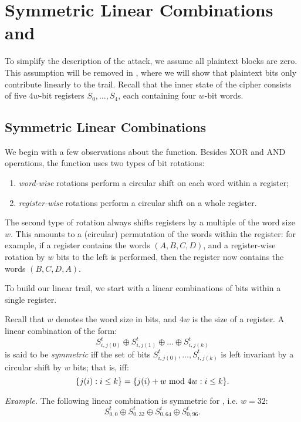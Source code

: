 
\section{Symmetric Linear Combinations and \MiniMORUS}
\label{sec/introminimorus}

To simplify the description of the attack, we assume all plaintext blocks are zero. This assumption will be removed in , where we will show that plaintext bits only contribute linearly to the trail. Recall that the inner state of the cipher consists of five $4w$-bit registers $S_0,\dots,S_4$, each containing four $w$-bit words.

\subsection{Symmetric Linear Combinations}

We begin with a few observations about the \StateUpdate{} function. Besides XOR and AND operations, the \StateUpdate{} function uses two types of bit rotations:
\begin{enumerate}
\item \emph{word-wise} rotations perform a circular shift on each word within a register;
\item \emph{register-wise} rotations perform a circular shift on a whole register.
\end{enumerate}
The second type of rotation always shifts registers by a multiple of the word size $w$. This amounts to a (circular) permutation of the words within the register: for example, if a register contains the words $(A, B, C, D)$, and a register-wise rotation by $w$ bits to the left is performed, then the register now contains the words $(B, C, D, A)$.

To build our linear trail, we start with a linear combinations of bits within a single register.
\begin{definition}
Recall that $w$ denotes the word size in bits, and $4w$ is the size of a register. A linear combination of the form:
\[
S^t_{i,j(0)} \oplus S^t_{i,j(1)} \oplus \dots \oplus S^t_{i,j(k)}
\]
is said to be \emph{symmetric} iff the set of bits $S^t_{i,j(0)}, \dots, S^t_{i,j(k)}$ is left invariant by a circular shift by $w$ bits; that is, iff:
\[
\{j(i) : i\leq k\} = \{j(i) + w \text{\rm{} mod } 4w : i\leq k\}.
\]
\end{definition}
\emph{Example.} The following linear combination is symmetric for \MORUS[640], i.e. $w = 32$:
\begin{equation}
S^t_{0,0} \oplus S^t_{0,32} \oplus S^t_{0,64} \oplus S^t_{0,96}.
\label{eq:symmetric}
\end{equation}

